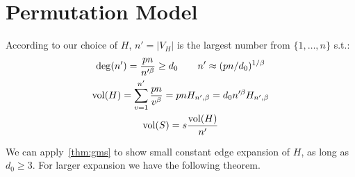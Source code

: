 \section{Permutation Model}

According to our choice of $H$, $n'=|V_H|$ is the largest number from $\{1,\ldots,n\}$ s.t.:
\begin{gather}
    \deg(n')=\frac{pn}{n'^\beta}\geq d_0
    \qquad n'\approx(pn/d_0)^{1/\beta}\\
    \operatorname*{vol}(H)=\sum_{v=1}^{n'}{\frac{pn}{v^\beta}}=pnH_{n',\beta}=d_0n'^\beta H_{n',\beta}\\
    \operatorname*{vol}(S)=s\frac{\operatorname*{vol}(H)}{n'}
\end{gather}

We can apply~\autoref{thm:gms} to show small constant edge expansion of $H$,
as long as $d_0\geq 3$. For larger expansion we have the following theorem.

